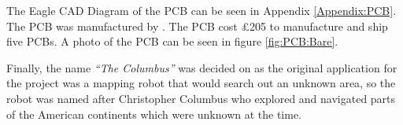 The Eagle CAD Diagram of the PCB can be seen in Appendix \ref{Appendix:PCB}. The PCB was manufactured by \cite{PCBCart}. The PCB cost \pounds 205 to manufacture and ship five PCBs. A photo of the PCB can be seen in figure \ref{fig:PCB:Bare}. 

Finally, the name \textit{``The Columbus''} was decided on as the original application for the project was a mapping robot that would search out an unknown area, so the robot was named after Christopher Columbus who explored and navigated parts of the American continents which were unknown at the time. 

\begin{figure}
\centering
{}

\end{figure}
